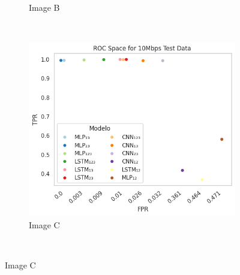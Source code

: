 \documentclass[a4paper,fleqn]{cas-sc}
\begin{document}
\begin{figure}
\begin{minipage}[t]{0.46\textwidth}
\begin{subfigure}[t]{0.33\textwidth}
				\caption{Image B}
				\label{fig:2a}
			\end{subfigure}%
			~
			\begin{subfigure}[t]{0.33\textwidth}
				\includegraphics[draft=false, width=\textwidth]{./figs/ROC-Space-Test-Data-10Mbps.png} 
				\caption{Image C}
				\label{fig:1c}
			\end{subfigure}%
			~
			

\end{minipage}
\end{figure}
\end{document}
